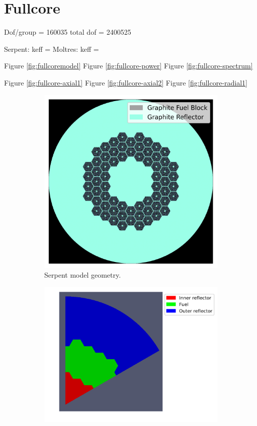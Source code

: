 \documentclass[11pt,letterpaper]{article}
\begin{document}
\section{Fullcore}

Dof/group = 160035
total dof = 2400525

Serpent: keff = 
Moltres: keff = 

Figure \ref{fig:fullcoremodel}
Figure \ref{fig:fullcore-power}
Figure \ref{fig:fullcore-spectrum}

Figure \ref{fig:fullcore-axial1}
Figure \ref{fig:fullcore-axial2}
Figure \ref{fig:fullcore-radial1}

\begin{figure}[htbp!]
	\centering
	\begin{subfigure}[t]{0.4\textwidth}
		\centering
		\includegraphics[width=\linewidth]{figures-fullcore/oecd-fullcore}
		\caption{Serpent model geometry.}
	\end{subfigure}
	\begin{subfigure}[t]{0.4\textwidth}
		\centering
		\includegraphics[width=\linewidth]{figures-fullcore/3D-fullcore-60-homo-meshB2}

\end{subfigure}
\end{figure}
\end{document}
